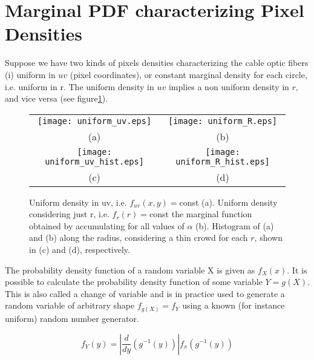 \section{Marginal PDF characterizing Pixel Densities}

Suppose we have two kinds of pixels densities characterizing the cable optic fibers (i) uniform in $uv$ (pixel coordinates), or constant marginal density for each circle, i.e. uniform in r. The uniform density in $uv$ implies a non uniform density in $r$, and vice versa (see figure\ref{fig:uniform_disp}).

\begin{figure}
\centering
\begin{tabular}{cc}
\texttt{[image: uniform\_uv.eps]} &
\texttt{[image: uniform\_R.eps]} \\
(a) & (b) \\
\texttt{[image: uniform\_uv\_hist.eps]} &
\texttt{[image: uniform\_R\_hist.eps]} \\
(c) & (d) 
\end{tabular}
\caption{
Uniform density in uv, i.e. $f_{uv}(x,y)=$const (a).
Uniform density considering just r, i.e. $f_r(r)=$const the marginal function obtained by accumulating for all values of $\alpha$ (b).
Histogram of (a) and (b) along the radius, considering a thin crowd for each $r$, shown in (c) and (d), respectively.
}
\label{fig:uniform_disp}
\end{figure}



The probability density function of a random variable X is given as $f_X(x)$. It is possible to calculate the probability density function of some variable $Y= g(X)$. This is also called a change of variable and is in practice used to generate a random variable of arbitrary shape $f_{g(X)} = f_Y$ using a known (for instance uniform) random number generator.

\begin{equation}
f_Y(y)=\left | \frac{d}{dy} (g^{-1}(y)) \right | f_x(g^{-1}(y))
\label{eq:wiki_copy}
\end{equation}


